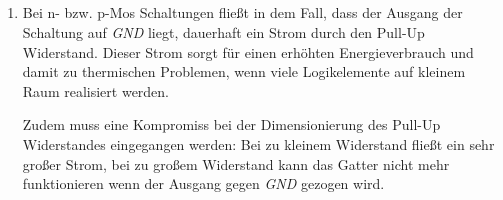 \documentclass[DIN, pagenumber=false, fontsize=11pt, parskip=half]{scrartcl}
\begin{document}
    \subsection{}
    \begin{enumerate}[label = (\alph*)]
        \item Bei n- bzw. p-Mos Schaltungen fließt in dem Fall, dass der Ausgang der Schaltung auf
            \textit{GND} liegt, dauerhaft ein Strom durch den Pull-Up Widerstand.
            Dieser Strom sorgt für einen erhöhten Energieverbrauch und damit zu 
            thermischen Problemen, wenn viele Logikelemente auf kleinem Raum realisiert werden.

            Zudem muss eine Kompromiss bei der Dimensionierung des Pull-Up Widerstandes
            eingegangen werden: Bei zu kleinem Widerstand fließt ein sehr großer Strom,
            bei zu großem Widerstand kann das Gatter nicht mehr funktionieren wenn
            der Ausgang gegen \textit{GND} gezogen wird.


\end{enumerate}
\end{document}
